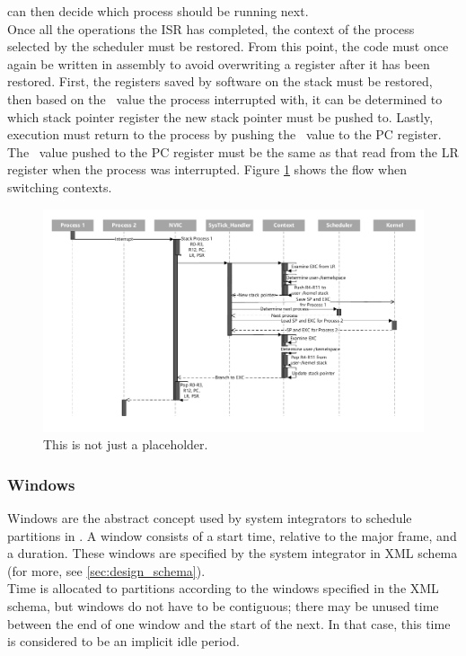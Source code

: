 can then decide which process should be running next.\\
Once all the operations the ISR has completed, the context of the process
selected by the scheduler must be restored. From this point, the code must once
again be written in assembly to avoid overwriting a register after it has been
restored. First, the registers saved by software on the stack must be restored,
then based on the \excreturn\ value the process interrupted with, it can be
determined to which stack pointer register the new stack pointer must be pushed
to. Lastly, execution must return to the process by pushing the \excreturn\ value
to the PC register. The \excreturn\ value pushed to the PC register must be the
same as that read from the LR register when the process was interrupted.
Figure \ref{fig:scheduling_sequence_diagram} shows the flow when switching contexts.
\begin{figure}
    \includegraphics[width=\textwidth]{figures/scheduling_sequence_diagram.pdf}
    \caption{This is not just a placeholder.}
    \label{fig:scheduling_sequence_diagram}
\end{figure}
\subsubsection{Windows}
\label{sssec:impl_windows}
Windows are the abstract concept used by system integrators to schedule
partitions in \arinc . A window consists of a start time, relative to the major
frame, and a duration. These windows are specified by the system integrator in
XML schema (for more, see \ref{sec:design_schema}).\\
Time is allocated to partitions according to the windows specified in the XML
schema, but windows do not have to be contiguous; there may be unused time
between the end of one window and the start of the next. In that case, this time
is considered to be an implicit idle period.

